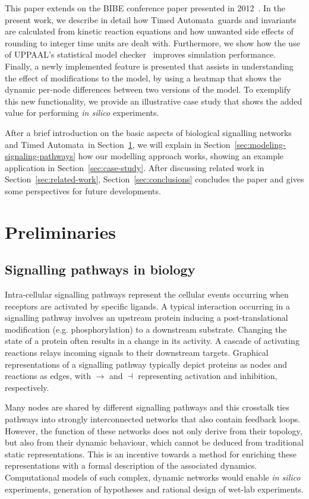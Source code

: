 \documentclass[journal, 10pt]{IEEEtran}
\def\ta{Timed Automaton}
\def\tas{Timed Automata}
\begin{document}
This paper extends on the BIBE conference paper presented in 2012~\cite{animo-bibe}. In the present work, we describe in detail how 
\tas\ guards and invariants are calculated from kinetic reaction equations and how unwanted side effects of rounding 
to integer time units are dealt with. Furthermore, we show how the use of UPPAAL's statistical model checker~\cite{uppaal-smc} improves simulation 
performance. Finally, a newly implemented feature is presented that assists in understanding the effect of 
modifications to the model, by using a heatmap that shows the dynamic per-node differences between two versions of the model. 
To exemplify this new functionality, we provide an illustrative case study that shows the added value for performing \emph{in silico} experiments.

After a brief introduction on the basic aspects of biological signalling networks and
\tas\ in Section~\ref{sec:preliminari}, we will explain in Section~\ref{sec:modeling-signaling-pathways} how our modelling approach works,
showing an example application in Section~\ref{sec:case-study}. After discussing related work in Section~\ref{sec:related-work},
Section~\ref{sec:conclusions} concludes the paper and gives some perspectives for future developments.


\def\ta{TA}
\def\tas{TA}

\section{Preliminaries}\label{sec:preliminari}

\subsection{Signalling pathways in biology}\label{sec:biologia}
Intra-cellular signalling pathways represent the cellular events occurring when receptors are activated by specific ligands.
A typical interaction occurring in a signalling pathway involves an upstream protein inducing a post-translational
modification (e.g. phosphorylation) to a downstream substrate. Changing the state of a protein often results in a change in its activity. 
A cascade of activating reactions relays incoming signals to their downstream targets. Graphical representations of a signalling pathway typically depict
proteins as nodes and reactions as edges, with $\rightarrow$ and $\dashv$ representing activation and inhibition, 
respectively.


Many nodes are shared by different signalling pathways and this crosstalk ties pathways into strongly interconnected 
networks that also contain feedback loops. However, the function of these networks does not only derive from their 
topology, but also from their dynamic behaviour, which cannot be deduced from traditional static representations.
This is an incentive towards a method for enriching these representations with a formal description 
of the associated dynamics. Computational models of such complex, dynamic networks would enable {\it in silico} 
experiments, generation of hypotheses and rational design of wet-lab experiments.
\end{document}
